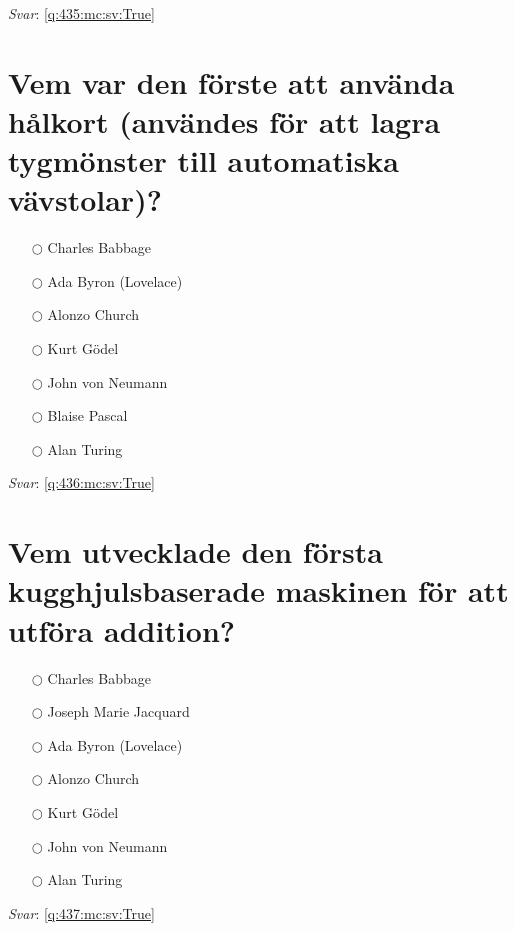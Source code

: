 \documentclass[a4paper,11pt,oneside]{book}
\begin{document}
\begin{sloppypar}
\textit{Svar}: \autoref{q:435:mc:sv:True}



\section{Vem var den f\"orste att anv\"anda h\r{a}lkort (anv\"andes f\"or att lagra tygm\"onster till automatiska v\"avstolar)?}

\label{q:436:mc:sv:False}

\begin{itemize}
  \item[$\bigcirc$] Charles Babbage
  \item[$\bigcirc$] Ada Byron (Lovelace)
  \item[$\bigcirc$] Alonzo Church
  \item[$\bigcirc$] Kurt G\"odel
  \item[$\bigcirc$] John von Neumann
  \item[$\bigcirc$] Blaise Pascal
  \item[$\bigcirc$] Alan Turing
\end{itemize}

\vspace{1cm}

\textit{Svar}: \autoref{q:436:mc:sv:True}



\section{Vem utvecklade den f\"orsta kugghjulsbaserade maskinen f\"or att utf\"ora addition?}

\label{q:437:mc:sv:False}

\begin{itemize}
  \item[$\bigcirc$] Charles Babbage
  \item[$\bigcirc$] Joseph Marie Jacquard
  \item[$\bigcirc$] Ada Byron (Lovelace)
  \item[$\bigcirc$] Alonzo Church
  \item[$\bigcirc$] Kurt G\"odel
  \item[$\bigcirc$] John von Neumann
  \item[$\bigcirc$] Alan Turing
\end{itemize}

\vspace{1cm}

\textit{Svar}: \autoref{q:437:mc:sv:True}




\end{sloppypar}
\end{document}
